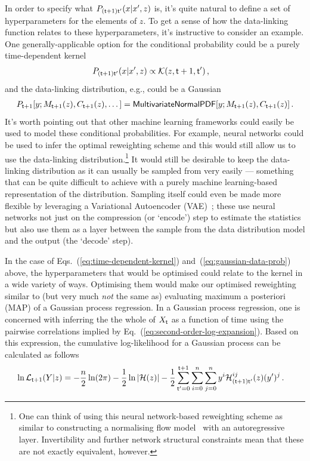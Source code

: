 In order to specify what $P_{({\sf t}+1){\sf t}'}(x\vert x',z)$ is, it's quite natural to define a set of hyperparameters for the elements of $z$. To get a sense of how the data-linking function relates to these hyperparameters, it's instructive to consider an example. One generally-applicable option for the conditional probability could be a purely time-dependent kernel
\begin{align}
P_{({\sf t}+1){\sf t}'}(x\vert x',z) &\propto {\cal K}(z, {\sf t}+1,{\sf t}')  \label{eq:time-dependent-kernel} \,, 
\end{align}
and the data-linking distribution, e.g., could be a Gaussian
\begin{align}
P_{{\sf t}+1}[y;M_{{\sf t}+1}(z),C_{{\sf t}+1}(z),\dots ] = {\sf MultivariateNormalPDF}[y;M_{{\sf t}+1}(z),C_{{\sf t}+1}(z)] \label{eq:gaussian-data-prob}\,.
\end{align}
It's worth pointing out that other machine learning frameworks could easily be used to model these conditional probabilities. For example, neural networks could be used to infer the optimal reweighting scheme and this would still allow us to use the data-linking distribution.\footnote{One can think of using this neural network-based reweighting scheme as similar to constructing a normalising flow model~\cite{kobyzev2020normalizing} with an autoregressive layer. Invertibility and further network structural constraints mean that these are not exactly equivalent, however.} It would still be desirable to keep the data-linking distribution as it can usually be sampled from very easily --- something that can be quite difficult to achieve with a purely machine learning-based representation of the distribution. Sampling itself could even be made more flexible by leveraging a Variational Autoencoder (VAE)~\cite{pinheiro2021variational}; these use neural networks not just on the compression (or `encode') step to estimate the statistics but also use them as a layer between the sample from the data distribution model and the output (the `decode' step).

In the case of Eqs.~(\ref{eq:time-dependent-kernel}) and~(\ref{eq:gaussian-data-prob}) above, the hyperparameters that would be optimised could relate to the kernel in a wide variety of ways. Optimising them would make our optimised reweighting similar to (but very much \emph{not} the same as) evaluating maximum a posteriori (MAP) of a Gaussian process regression. In a Gaussian process regression, one is concerned with inferring the the whole of $X_{{\sf t}}$ as a function of time using the pairwise correlations implied by Eq.~(\ref{eq:second-order-log-expansion}). Based on this expression, the cumulative log-likelihood for a Gaussian process can be calculated as follows
\begin{align}
\ln {\cal L}_{{\sf t}+1}(Y\vert z) &= -\frac{n}{2}\ln (2\pi ) - \frac{1}{2}\ln \vert {\cal H}(z)\vert - \frac{1}{2}\sum_{{\sf t}'=0}^{{\sf t}+1}\sum_{i=0}^{n}\sum_{j=0}^{n} y^i {\cal H}^{ij}_{({\sf t}+1){\sf t}'}(z) (y')^j \,. \label{eq:log-likelihood-gaussian-proc}    
\end{align}

